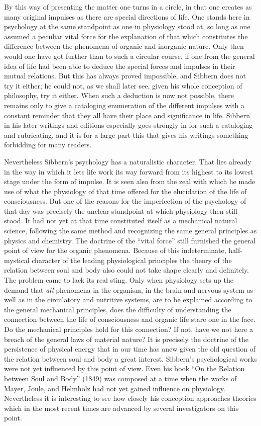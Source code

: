 \documentclass[12pt,a4paper,openany]{book}
\newcommand{\opage}[1]{\marginnote{\footnotesize\textit{[#1]}}}
\begin{document}
By this way of presenting the matter one turns
in a circle, in that one creates as many original
impulses as there are special directions of life. One stands here in
psychology at the same standpoint as one in physiology
stood at, so long as one assumed a peculiar vital force for
the explanation of that which constitutes the difference between the phenomena of organic
and inorganic nature. Only then would one
have got further than to such a circular course, if one
from the general idea of life had been able to deduce the special
forces and impulses in their mutual relations. But this
has always proved impossible, and Sibbern does not try
it either; he could not, as we shall later see, given his whole
conception of philosophy, try it either. When such a
deduction is now not possible, there remains only to
give a cataloging enumeration of the different impulses
with a constant reminder that they all have their place and
significance in life. Sibbern in his later writings
and editions especially goes strongly in for such a cataloging and
\opage{79}rubricating, and it is for a large part this that gives his writings
something forbidding for many readers.

Nevertheless Sibbern's psychology has a naturalistic character.
That lies already in the way in which it lets life
work its way forward from its highest to its lowest stage under
\opage{80}the form of impulse. It is seen also from the zeal with which he
made use of what the physiology of that time offered for the elucidation
of the life of consciousness. But one of the reasons for
the imperfection of the psychology of that day was precisely the unclear
standpoint at which physiology then still stood. It had not yet
at that time constituted itself as a mechanical natural science,
following the same method and recognizing the same general
principles as physics and chemistry. The doctrine of the ``vital force''
still furnished the general point of view for the organic
phenomena. Because of this indeterminate, half-mystical character of the leading
physiological principles the theory of the relation between
soul and body also could not take shape clearly and definitely.
The problem came to lack its real sting. Only when
physiology sets up the demand that \emph{all} phenomena in
the organism, in the brain and nervous system as well as in the circulatory and
nutritive systems, are to be explained according to the general
mechanical principles, does the difficulty of understanding
the connection between the life of consciousness and organic life stare one in the face.
Do the mechanical principles hold for this connection? If
not, have we not here a breach of the general laws of material nature?
It is precisely the doctrine of the persistence of physical energy
that in our time has anew given the old
question of the relation between soul and body a great
interest. Sibbern's psychological works were not yet
influenced by this point of view. Even his book ``On the Relation
between Soul and Body'' (1849) was composed at a
time when the works of Mayer, Joule, and Helmholz had not yet
gained influence on physiology. Nevertheless it is
interesting to see how closely his conception approaches
theories which in the most recent times are advanced by several
investigators on this point.
\end{document}
